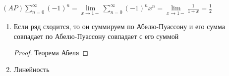 \begin{example}
    $(AP) \sum\limits_{n=0}^\infty (-1)^n = \lim\limits_{x \to 1-} \sum\limits_{n=0}^\infty (-1)^n x^n = \lim\limits_{x\to 1-} \frac{1}{1 + x} = \frac{1}{2}$
\end{example}

\begin{properties}
    \begin{enumerate}
        \item {
            Если ряд сходится, то он суммируем по Абелю-Пуассону и его сумма совпадает по Абелю-Пуассону совпадает с его суммой

            \begin{proof}
                Теорема Абеля
            \end{proof}
        }
        \item {
            Линейность
        }
    \end{enumerate}
\end{properties}

